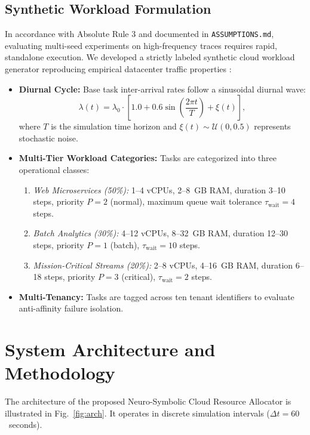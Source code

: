 \documentclass[conference]{IEEEtran}
\begin{document}
\subsection{Synthetic Workload Formulation}
In accordance with Absolute Rule 3 and documented in \texttt{ASSUMPTIONS.md}, evaluating multi-seed experiments on high-frequency traces requires rapid, standalone execution. We developed a strictly labeled synthetic cloud workload generator reproducing empirical datacenter traffic properties \cite{reiss2012heterogeneity}:
\begin{itemize}
    \item \textbf{Diurnal Cycle:} Base task inter-arrival rates follow a sinusoidal diurnal wave:
    \begin{equation}
    \lambda(t) = \lambda_0 \cdot \left[1.0 + 0.6 \sin\left(\frac{2\pi t}{T}\right) + \xi(t)\right],
    \end{equation}
    where $T$ is the simulation time horizon and $\xi(t) \sim \mathcal{U}(0, 0.5)$ represents stochastic noise.
    \item \textbf{Multi-Tier Workload Categories:} Tasks are categorized into three operational classes:
    \begin{enumerate}
        \item \textit{Web Microservices (50\%):} 1--4 vCPUs, 2--8~GB RAM, duration 3--10 steps, priority $P=2$ (normal), maximum queue wait tolerance $\tau_{\text{wait}} = 4$ steps.
        \item \textit{Batch Analytics (30\%):} 4--12 vCPUs, 8--32~GB RAM, duration 12--30 steps, priority $P=1$ (batch), $\tau_{\text{wait}} = 10$ steps.
        \item \textit{Mission-Critical Streams (20\%):} 2--8 vCPUs, 4--16~GB RAM, duration 6--18 steps, priority $P=3$ (critical), $\tau_{\text{wait}} = 2$ steps.
    \end{enumerate}
    \item \textbf{Multi-Tenancy:} Tasks are tagged across ten tenant identifiers to evaluate anti-affinity failure isolation.
\end{itemize}

\section{System Architecture and Methodology}
The architecture of the proposed Neuro-Symbolic Cloud Resource Allocator is illustrated in Fig.~\ref{fig:arch}. It operates in discrete simulation intervals ($\Delta t = 60$~seconds).
\end{document}
